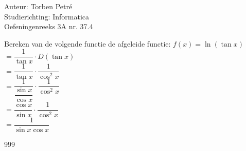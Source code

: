 \documentclass[a4paper]{article}
\begin{document}
  
\noindent \large Auteur: Torben Petré \\
\noindent \large Studierichting: Informatica\\
\noindent \large Oefeningenreeks 3A nr. 37.4\\

\medskip

\normalsize

Bereken van de volgende functie de afgeleide functie: $f(x) = \ln(\tan x)$\\

$= \dfrac{1}{\tan x} \cdot D(\tan x)$\\

$= \dfrac{1}{\tan x} \cdot \dfrac{1}{\cos^2 x}$\\

$= \dfrac{1}{\dfrac{\sin x}{\cos x}} \cdot \dfrac{1}{\cos^2 x}$\\

$= \dfrac{\cos x}{\sin x} \cdot \dfrac{1}{\cos^2 x}$\\

$= \dfrac{1}{\sin x\cos x}$\\

\begin{thebibliography}{999}
\end{thebibliography}
\end{document}
